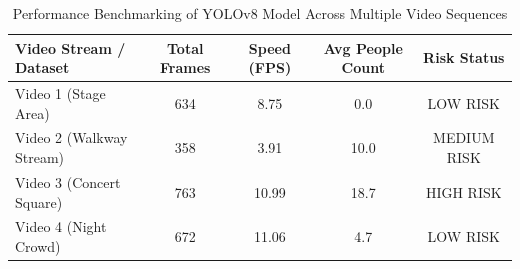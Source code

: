 \begin{table}[htbp]
\centering
\caption{Performance Benchmarking of YOLOv8 Model Across Multiple Video Sequences}
\label{tab:yolov8_benchmarks}
\begin{tabular}{|l|c|c|c|c|}
\hline
\textbf{Video Stream / Dataset} & \textbf{Total Frames} & \textbf{Speed (FPS)} & \textbf{Avg People Count} & \textbf{Risk Status} \\ \hline
Video 1 (Stage Area) & 634 & 8.75 & 0.0 & LOW RISK \\ \hline
Video 2 (Walkway Stream) & 358 & 3.91 & 10.0 & MEDIUM RISK \\ \hline
Video 3 (Concert Square) & 763 & 10.99 & 18.7 & HIGH RISK \\ \hline
Video 4 (Night Crowd) & 672 & 11.06 & 4.7 & LOW RISK \\ \hline
\end{tabular}
\end{table}
